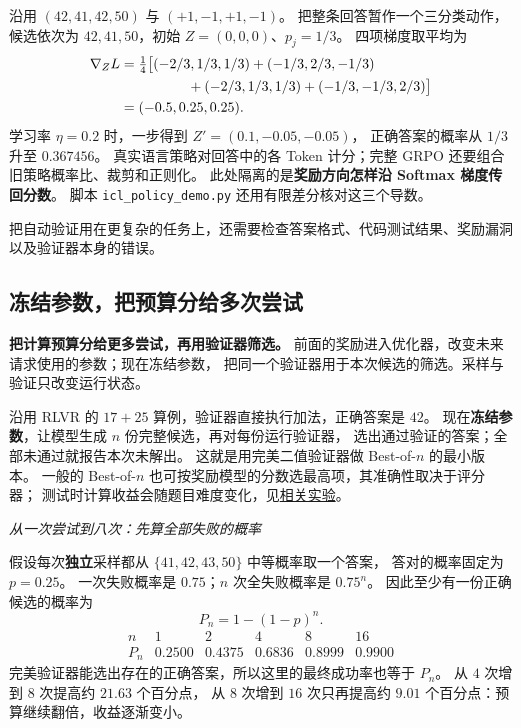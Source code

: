 沿用 $(42,41,42,50)$ 与 $(+1,-1,+1,-1)$。
把整条回答暂作一个三分类动作，候选依次为 $42,41,50$，初始 $Z=(0,0,0)$、$p_j=1/3$。
四项梯度取平均为
\[
\begin{aligned}
\nabla_Z L
&=\tfrac14\bigl[(-2/3,1/3,1/3)+(-1/3,2/3,-1/3)\\
&\hspace{17mm}+(-2/3,1/3,1/3)+(-1/3,-1/3,2/3)\bigr]\\
&=\boxed{(-0.5,0.25,0.25)}.
\end{aligned}
\]
学习率 $\eta=0.2$ 时，一步得到 $Z'=(0.1,-0.05,-0.05)$，
正确答案的概率从 $1/3$ 升至 $\boxed{0.367456}$。
真实语言策略对回答中的各 Token 计分；完整 GRPO 还要组合旧策略概率比、裁剪和正则化。
此处隔离的是\textbf{奖励方向怎样沿 Softmax 梯度传回分数}。
脚本 \texttt{icl\_policy\_demo.py} 还用有限差分核对这三个导数。

把自动验证用在更复杂的任务上，还需要检查答案格式、代码测试结果、奖励漏洞以及验证器本身的错误。



\subsection{冻结参数，把预算分给多次尝试}
\label{concept:test-time-compute}

\textbf{把计算预算分给更多尝试，再用验证器筛选。}
前面的奖励进入优化器，改变未来请求使用的参数；现在冻结参数，
把同一个验证器用于本次候选的筛选。采样与验证只改变运行状态。

沿用 RLVR 的 $17+25$ 算例，验证器直接执行加法，正确答案是 $42$。
现在\textbf{冻结参数}，让模型生成 $n$ 份完整候选，再对每份运行验证器，
选出通过验证的答案；全部未通过就报告本次未解出。
这就是用完美二值验证器做 Best-of-$n$ 的最小版本。
一般的 Best-of-$n$ 也可按奖励模型的分数选最高项，其准确性取决于评分器；
测试时计算收益会随题目难度变化，见\hyperref[source:test-time-compute]{相关实验}。

\begin{example}[breakable=false]
\noindent\emph{从一次尝试到八次：先算全部失败的概率}\par
假设每次\textbf{独立}采样都从 $\{41,42,43,50\}$ 中等概率取一个答案，
答对的概率固定为 $p=0.25$。
一次失败概率是 $0.75$；$n$ 次全失败概率是 $0.75^n$。
因此至少有一份正确候选的概率为
\[
P_n=1-(1-p)^n.
\]
\[
\begin{array}{c|ccccc}
n&1&2&4&8&16\\\hline
P_n&0.2500&0.4375&0.6836&0.8999&0.9900
\end{array}
\]
完美验证器能选出存在的正确答案，所以这里的最终成功率也等于 $P_n$。
从 $4$ 次增到 $8$ 次提高约 $21.63$ 个百分点，
从 $8$ 次增到 $16$ 次只再提高约 $9.01$ 个百分点：预算继续翻倍，收益逐渐变小。
\end{example}

